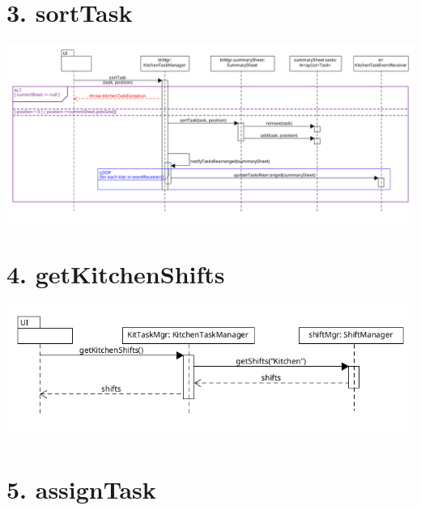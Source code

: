\pagebreak

\section*{3. sortTask}

\begin{center}
  \includegraphics[scale = 0.35]{images/DSD/DSD 3.png}
\end{center}

\pagebreak

\section*{4. getKitchenShifts}

\begin{center}
  \includegraphics[scale = 0.5]{images/DSD/DSD 4.png}
\end{center}

\pagebreak

\section*{5. assignTask}

